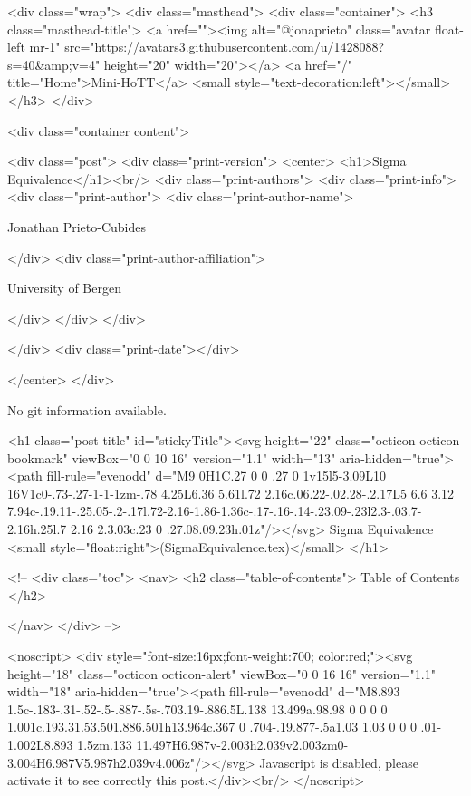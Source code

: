     <div class="wrap">
      <div class="masthead">
        <div class="container">
          <h3 class="masthead-title">
            <a href=""><img alt="@jonaprieto" class="avatar float-left mr-1" src="https://avatars3.githubusercontent.com/u/1428088?s=40&amp;v=4" height="20" width="20"></a>
            <a href="/" title="Home">Mini-HoTT</a>
            <small style="text-decoration:left"></small>
          </h3>
        </div>
      
      <div class="container content">
        







<div class="post">
  <div class="print-version">
    <center>
      <h1>Sigma Equivalence</h1><br/>
        <div class="print-authors">
          <div class="print-info">
            <div class="print-author">
              <div class="print-author-name">
                
                  Jonathan Prieto-Cubides
                
              </div>
              <div class="print-author-affiliation">
                
                  University of Bergen
                
                </div>
            </div>
          </div>
          
          
        </div>
        <div class="print-date"></div>
        
        
    </center>
  </div>

  
  No git information available.
  

  <h1 class="post-title" id="stickyTitle"><svg height="22" class="octicon octicon-bookmark" viewBox="0 0 10 16" version="1.1" width="13" aria-hidden="true"><path fill-rule="evenodd" d="M9 0H1C.27 0 0 .27 0 1v15l5-3.09L10 16V1c0-.73-.27-1-1-1zm-.78 4.25L6.36 5.61l.72 2.16c.06.22-.02.28-.2.17L5 6.6 3.12 7.94c-.19.11-.25.05-.2-.17l.72-2.16-1.86-1.36c-.17-.16-.14-.23.09-.23l2.3-.03.7-2.16h.25l.7 2.16 2.3.03c.23 0 .27.08.09.23h.01z"/></svg> Sigma Equivalence <small style="float:right">(SigmaEquivalence.tex)</small>
  </h1>

  <!-- 
  <div class="toc">
    <nav>
    <h2 class="table-of-contents"> Table of Contents </h2>
      

    </nav>
  </div>
   -->

  <noscript>
  <div style="font-size:16px;font-weight:700; color:red;"><svg height="18" class="octicon octicon-alert" viewBox="0 0 16 16" version="1.1" width="18" aria-hidden="true"><path fill-rule="evenodd" d="M8.893 1.5c-.183-.31-.52-.5-.887-.5s-.703.19-.886.5L.138 13.499a.98.98 0 0 0 0 1.001c.193.31.53.501.886.501h13.964c.367 0 .704-.19.877-.5a1.03 1.03 0 0 0 .01-1.002L8.893 1.5zm.133 11.497H6.987v-2.003h2.039v2.003zm0-3.004H6.987V5.987h2.039v4.006z"/></svg> Javascript is disabled, please activate it to see correctly this post.</div><br/>
  </noscript>

